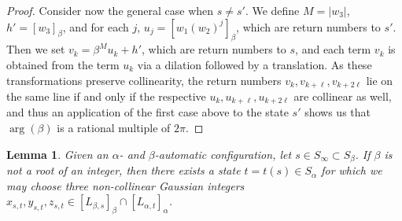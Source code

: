 \documentclass{amsart}
\newcommand{\tcr}{\textcolor{red}}
\newtheorem*{main theorem}{Theorem \ref{thm:main-gaussian}}
\newtheorem{lemma}[theorem]{Lemma}
\theoremstyle{definition}
\newtheorem{remark}[theorem]{Remark}
\begin{document}
\begin{proof}
    Consider now the general case when $s\neq s'$.   We define $M=\lvert w_3\rvert$, $h' = [w_3]_\beta$, and for each $j$, $u_j=[w_1(w_2)^j]_\beta$, which are return numbers to $s'$.
    Then we set    $v_k=\beta^M u_k+h'$, which are return numbers to $s$, and  each term $v_k$ is obtained from the term $u_k$ via a dilation followed by a translation. As these transformations preserve collinearity, the  return numbers $v_k, v_{k+\ell}, v_{k+2\ell}$ lie on the same line if and only if the respective  $u_k, u_{k+\ell}, u_{k+2\ell}$ are collinear as well, and thus an application of the first case above to the state $s'$ shows us that $\arg(\beta)$ is a rational multiple of $2\pi$. 
\end{proof}




\begin{lemma}\label{lem:non-collinearity-with-two-automata}
   Given an $\alpha$- and $\beta$-automatic configuration, let $s\in S_\infty\subset S_\beta$. If  $\beta$ is not a root of an integer,
     then there exists a state $t=t(s)\in S_\alpha$ for which we may choose three non-collinear Gaussian integers $x_{s,t},y_{s,t},z_{s,t}\in [L_{\beta,s}]_\beta\cap [L_{\alpha,t}]_\alpha$. \end{lemma}
     
\end{document}
